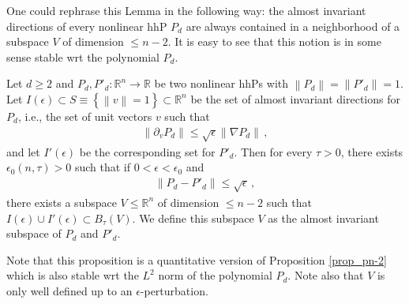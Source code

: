 \documentclass[11pt]{article}
\begin{document}
One could rephrase this Lemma in the following way: the almost invariant directions of every nonlinear hhP $P_d$ are always contained in a neighborhood of a subspace $V$ of dimension $\leq n-2$. It is easy to see that this notion is in some sense stable wrt the polynomial $P_d$.
\begin{proposition}\label{prop_alcone}
 Let $d\geq2$ and $P_d, P'_d:{\mathbb{R}}^n\to {\mathbb{R}}$ be two nonlinear hhPs with ${\left\|{P_d}\right\|}={\left\|{P'_d}\right\|}=1$. Let $I(\epsilon)\subset S\equiv{\left\{{{\left\|v\right\|} =1}\right\}}\subset {\mathbb{R}}^n$ be the set of almost invariant directions for $P_d$, i.e., the set of unit vectors $v$ such that
 \begin{gather}
  {\left\|{\partial_v P_d}\right\|}\leq \sqrt \epsilon {\left\|{\nabla P_d}\right\|}\, , 
 \end{gather}
and let $I'(\epsilon)$ be the corresponding set for $P'_d$. Then for every $\tau>0$, there exists $\epsilon_0(n,\tau)>0$ such that if $0<\epsilon<\epsilon_0$ and
\begin{gather}
 {\left\|{P_d-P'_d}\right\|}\leq \sqrt{\epsilon}\, ,
\end{gather}
there exists a subspace $V\leq {\mathbb{R}}^n$ of dimension $\leq n-2$ such that $I(\epsilon)\cup I'(\epsilon)\subset B_\tau(V)$. We define this subspace $V$ as the almost invariant subspace of $P_d$ and $P'_d$.
\end{proposition}

\begin{remark}
 Note that this proposition is a quantitative version of Proposition \ref{prop_pn-2} which is also stable wrt the $L^2$ norm of the polynomial $P_d$.  Note also that $V$ is only well defined up to an $\epsilon$-perturbation.
\end{remark}
\end{document}
